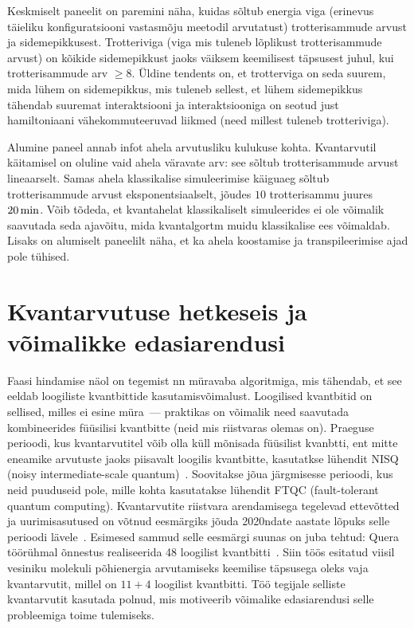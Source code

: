 \documentclass[12pt]{report}
\begin{document}
Keskmiselt paneelit on paremini näha, kuidas sõltub energia viga (erinevus täieliku konfiguratsiooni vastasmõju meetodil arvutatust) trotterisammude arvust ja sidemepikkusest.
Trotteriviga (viga mis tuleneb lõplikust trotterisammude arvust) on kõikide sidemepikkust jaoks väiksem keemilisest täpsusest juhul, kui trotterisammude arv \(\ge 8\).
Üldine tendents on, et trotterviga on seda suurem, mida lühem on sidemepikkus, mis tuleneb sellest, et lühem sidemepikkus tähendab suuremat interaktsiooni ja interaktsiooniga on seotud just hamiltoniaani vähekommuteeruvad liikmed (need millest tuleneb trotteriviga).

Alumine paneel annab infot ahela arvutusliku kulukuse kohta.
Kvantarvutil käitamisel on oluline vaid ahela väravate arv: see sõltub trotterisammude arvust lineaarselt.
Samas ahela klassikalise simuleerimise käiguaeg sõltub trotterisammude arvust eksponentsiaalselt, jõudes \(10\) trotterisammu juures \(20\,{\rm min}\).
Võib tõdeda, et kvantahelat klassikaliselt simuleerides ei ole võimalik saavutada seda ajavõitu, mida kvantalgortm muidu klassikalise ees võimaldab.
Lisaks on alumiselt paneelilt näha, et ka ahela koostamise ja transpileerimise ajad pole tühised.

\section{Kvantarvutuse hetkeseis ja võimalikke edasiarendusi}

Faasi hindamise näol on tegemist nn müravaba algoritmiga, mis tähendab, et see eeldab loogiliste kvantbittide kasutamisvõimalust.
Loogilised kvantbitid on sellised, milles ei esine müra~--- praktikas on võimalik need saavutada kombineerides füüsilisi kvantbitte (neid mis riistvaras olemas on).
Praeguse perioodi, kus kvantarvutitel võib olla küll mõnisada füüsilist kvanbtti, ent mitte eneamike arvutuste jaoks piisavalt loogilis kvantbitte, kasutatkse lühendit NISQ (noisy intermediate-scale quantum)~\cite{preskill}.
Soovitakse jõua järgmisesse perioodi, kus neid puuduseid pole, mille kohta kasutatakse lühendit FTQC (fault-tolerant quantum computing).
Kvantarvutite riistvara arendamisega tegelevad ettevõtted ja uurimisasutused on võtnud eesmärgiks jõuda 2020ndate aastate lõpuks selle perioodi lävele~\cite{ibmq+roadmap, quera+roadmap}.
Esimesed sammud selle eesmärgi suunas on juba tehtud: Quera töörühmal õnnestus realiseerida 48 loogilist kvantbitti~\cite{quera}.
Siin töös esitatud viisil vesiniku molekuli põhienergia arvutamiseks keemilise täpsusega oleks vaja kvantarvutit, millel on \(11 + 4\) loogilist kvantbitti.
Töö tegijale selliste kvantarvutit kasutada polnud, mis motiveerib võimalike edasiarendusi selle probleemiga toime tulemiseks.
\end{document}
